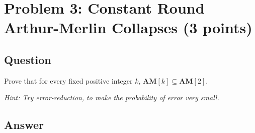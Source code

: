 \documentclass{article}
\renewcommand{\P}{\mathbf{P}}
\newcommand{\NP}{\mathbf{NP}}
\newcommand{\BPP}{\mathbf{BPP}}
\newcommand{\AM}{\mathbf{AM}}
\def \eps {{\varepsilon}}
\begin{document}






\newpage
\section*{Problem 3: Constant Round Arthur-Merlin Collapses (3 points)}

\subsection*{Question}
Prove that for every fixed positive integer $k$, $\AM[k]\subseteq \AM[2]$.

\medskip

\emph{Hint: Try error-reduction, to make the probability of error very small.}


\subsection*{Answer}
\end{document}
